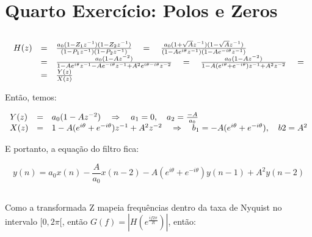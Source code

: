 \section{Quarto Exercício: Polos e Zeros}

\subsection{}

\[\displaystyle
\begin{array}{l c l}
  H(z) & = & \frac{a_0 (1 - Z_1 z^{-1})(1 - Z_2 z^{-1} )}{(1 - P_1 z^{-1})(1 - P_2 z^{-1})} \quad = \quad \frac{a_0 (1+\sqrt{A}z^{-1})(1-\sqrt{A}z^{-1})}{(1-Ae^{i\theta}z^{-1})(1-Ae^{-i\theta}z^{-1})} \\
       & = & \frac{a_0 (1-Az^{-2})}{1-Ae^{i\theta}z^{-1} - Ae^{-i\theta}z^{-1} + A^2 e^{i\theta-i\theta}z^{-2}} \quad = \quad \frac{a_0 (1-Az^{-2})}{1-A(e^{i\theta}+e^{-i\theta})z^{-1}+A^2 z^{-2}}
\quad = \\
       & = & \frac{Y(z)}{X(z)}
\end{array}
\]

Então, temos:

\[\displaystyle
\begin{array}{l c l}
  Y(z) & = & a_0 (1-Az^{-2}) \quad \Rightarrow \quad a_1 = 0, \quad a_2 = \frac{-A}{a_0} \\
  X(z) & = & 1-A(e^{i\theta}+e^{-i\theta})z^{-1}+A^2 z^{-2} \quad \Rightarrow \quad b_1 = -A(e^{i\theta}+e^{-i\theta}), \quad b2 = A^2
\end{array}
\]

E portanto, a equação do filtro fica:

\begin{equation}\displaystyle
  y(n) = a_0x(n) - \frac{A}{a_0}x(n-2) -A(e^{i\theta}+e^{-i\theta})y(n-1) + A^2y(n-2)
\end{equation}


\subsection{}

Como a transformada Z mapeia frequências dentro da taxa de Nyquist no intervalo $[0, 2\pi[$, então $G(f) = |H(e^{\frac{if2\pi}{R}})|$, então:

